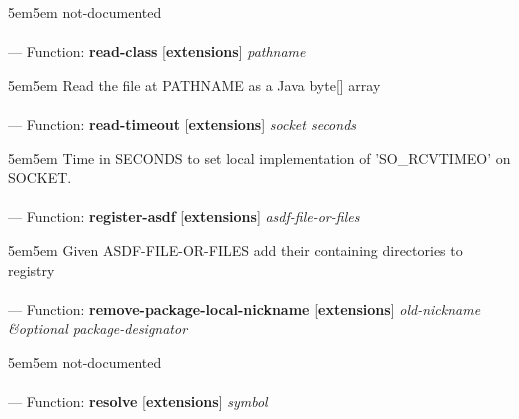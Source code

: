 \begin{adjustwidth}{5em}{5em}
not-documented
\end{adjustwidth}

\paragraph{}
\label{EXTENSIONS:READ-CLASS}
--- Function: \textbf{read-class} [\textbf{extensions}] \textit{pathname}

\begin{adjustwidth}{5em}{5em}
Read the file at PATHNAME as a Java byte[] array
\end{adjustwidth}

\paragraph{}
\label{EXTENSIONS:READ-TIMEOUT}
--- Function: \textbf{read-timeout} [\textbf{extensions}] \textit{socket seconds}

\begin{adjustwidth}{5em}{5em}
Time in SECONDS to set local implementation of 'SO\_RCVTIMEO' on SOCKET.
\end{adjustwidth}

\paragraph{}
\label{EXTENSIONS:REGISTER-ASDF}
--- Function: \textbf{register-asdf} [\textbf{extensions}] \textit{asdf-file-or-files}

\begin{adjustwidth}{5em}{5em}
Given ASDF-FILE-OR-FILES add their containing directories to registry
\end{adjustwidth}

\paragraph{}
\label{EXTENSIONS:REMOVE-PACKAGE-LOCAL-NICKNAME}
--- Function: \textbf{remove-package-local-nickname} [\textbf{extensions}] \textit{old-nickname \&optional package-designator}

\begin{adjustwidth}{5em}{5em}
not-documented
\end{adjustwidth}

\paragraph{}
\label{EXTENSIONS:RESOLVE}
--- Function: \textbf{resolve} [\textbf{extensions}] \textit{symbol}

